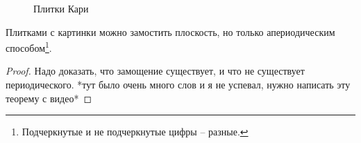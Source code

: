 \begin{figure}[ht]
    \centering
    \caption{Плитки Кари}
    \label{fig:kari-tiles}
\end{figure}
\begin{thm}
    Плитками с картинки можно замостить плоскость, но только апериодическим способом\footnote{Подчеркнутые и не подчеркнутые цифры -- разные.}.
\end{thm}
\begin{proof}
    Надо доказать, что замощение существует, и что не существует периодического.
    *тут было очень много слов и я не успевал, нужно написать эту теорему с видео*
\end{proof}



